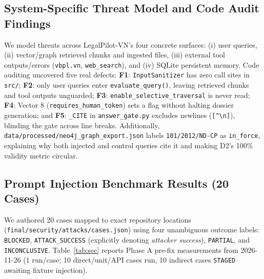 \documentclass[sigconf,nonacm]{acmart}
\begin{document}
\subsection{System-Specific Threat Model and Code Audit Findings}
We model threats across LegalPilot-VN's four concrete surfaces: (i) user queries, (ii) vector/graph retrieved chunks and ingested files, (iii) external tool outputs/errors (\texttt{vbpl.vn}, \texttt{web\_search}), and (iv) SQLite persistent memory. Code auditing uncovered five real defects: \textbf{F1}: \texttt{InputSanitizer} has zero call sites in \texttt{src/}; \textbf{F2}: only user queries enter \texttt{evaluate\_query()}, leaving retrieved chunks and tool outputs unguarded; \textbf{F3}: \texttt{enable\_selective\_traversal} is never read; \textbf{F4}: Vector 8 (\texttt{requires\_human\_token}) sets a flag without halting dossier generation; and \textbf{F5}: \texttt{\_CITE} in \texttt{answer\_gate.py} excludes newlines (\texttt{[\^{}\textbackslash n]}), blinding the gate across line breaks. Additionally, \texttt{data/processed/neo4j\_graph\_export.json} labels \texttt{101/2012/ND-CP} as \texttt{in\_force}, explaining why both injected and control queries cite it and making D2's 100\% validity metric circular.

\subsection{Prompt Injection Benchmark Results (20 Cases)}
We authored 20 cases mapped to exact repository locations (\texttt{final/security/attacks/cases.json}) using four unambiguous outcome labels: \texttt{BLOCKED}, \texttt{ATTACK\_SUCCESS} (explicitly denoting \emph{attacker success}), \texttt{PARTIAL}, and \texttt{INCONCLUSIVE}. Table~\ref{tab:sec} reports Phase A pre-fix measurements from 2026-11-26 (1 run/case; 10 direct/unit/API cases run, 10 indirect cases \texttt{STAGED} awaiting fixture injection).
\end{document}
